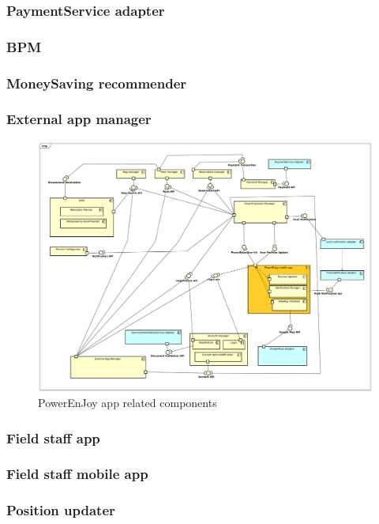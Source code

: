 \documentclass[english]{article}
\begin{document}
	\subsubsection{PaymentService adapter}
	
	\subsubsection{BPM}
		\subsubsection{MoneySaving recommender }
	
	\subsubsection{External app manager}
	\begin{figure}[H]
		\centering
		\includegraphics[scale=0.26]{./ComponentDiagrams/PowerEnjoyuser.pdf}%
		\caption{PowerEnJoy app related components}
	\end{figure}
	
	
\subsubsection*{Field staff app}
	
	\subsubsection{Field staff mobile app}
		\subsubsection{Position updater}
\end{document}
